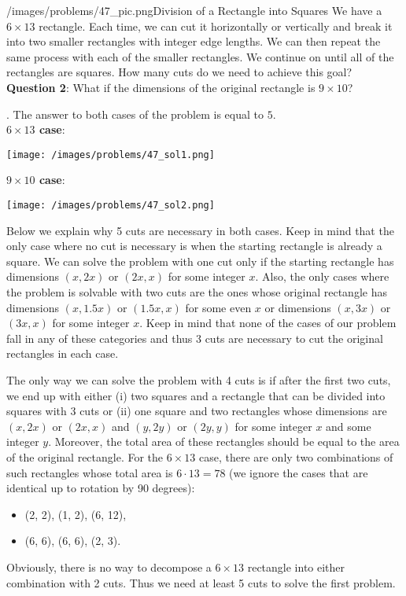 \begin{problem}{/images/problems/47_pic.png}{Division of a Rectangle into Squares} We have a $6 \times 13$ rectangle. Each time, we can cut it horizontally or vertically and break it into two smaller rectangles with integer edge lengths. We can then repeat the same process with each of the smaller rectangles. We continue on until all of the rectangles are squares. How many cuts do we need to achieve this goal?\\[0.2cm]
	
\textbf{Question 2}: What if the dimensions of the original rectangle is $9 \times 10$?\end{problem}
\begin{solution}.
The answer to both cases of the problem is equal to $5$.\\[0.2cm]
\noindent \textbf{$6 \times 13$ case}: 
\begin{center}
	\texttt{[image: /images/problems/47\_sol1.png]}
\end{center}
\noindent \textbf{$9 \times 10$ case}: 
\begin{center}
	\texttt{[image: /images/problems/47\_sol2.png]}
\end{center}
Below we explain why 5 cuts are necessary in both cases. Keep in mind that the only case where no cut is necessary is when the starting rectangle is already a square. We can solve the problem with one cut only if the starting rectangle has dimensions $(x,2x)$ or $(2x,x)$ for some integer $x$. Also, the only cases where the problem is solvable with two cuts are the ones whose original rectangle has dimensions $(x,1.5x)$ or $(1.5x, x)$ for some even $x$ or dimensions $(x,3x)$ or $(3x,x)$ for some integer $x$. Keep in mind that none of the cases of our problem fall in any of these categories and thus 3 cuts are necessary to cut the original rectangles in each case.

The only way we can solve the problem with 4 cuts is if after the first two cuts, we end up with either (i) two squares and a rectangle that can be divided into squares with 3 cuts or (ii) one square and two rectangles whose dimensions are $(x,2x)$ or $(2x,x)$ and $(y,2y)$ or $(2y,y)$ for some integer $x$ and some integer $y$. Moreover, the total area of these rectangles should be equal to the area of the original rectangle. For the $6 \times 13$ case, there are only two combinations of such rectangles whose total area is $6\cdot 13 = 78$ (we ignore the cases that are identical up to rotation by 90 degrees):
\begin{itemize}
	\item (2, 2), (1, 2), (6, 12),
	\item (6, 6), (6, 6), (2, 3).
\end{itemize} 
Obviously, there is no way to decompose a $6 \times 13$ rectangle into either combination with 2 cuts. Thus we need at least 5 cuts to solve the first problem.


\end{solution}
